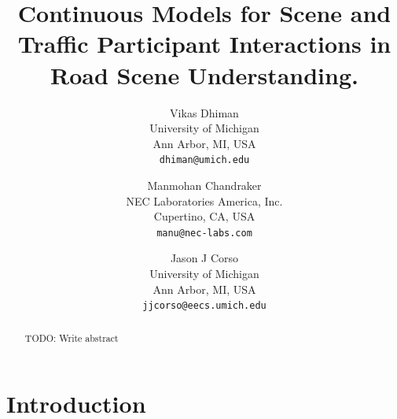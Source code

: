 \documentclass[10pt,twocolumn,letterpaper]{article}
\begin{document}
\title{Continuous Models for Scene and Traffic Participant Interactions in Road Scene Understanding.}
\author{Vikas Dhiman\\
  University of Michigan\\
  Ann Arbor, MI, USA\\
{\tt\small dhiman@umich.edu}
\and
Manmohan Chandraker\\
NEC Laboratories America, Inc.\\
Cupertino, CA, USA\\
{\tt\small manu@nec-labs.com}
\and
Jason J Corso\\
  University of Michigan\\
  Ann Arbor, MI, USA\\
{\tt\small jjcorso@eecs.umich.edu}
}
\maketitle

\begin{abstract}
  TODO: Write abstract
  \vspace{4cm}
\end{abstract}

\section{Introduction}
\end{document}
